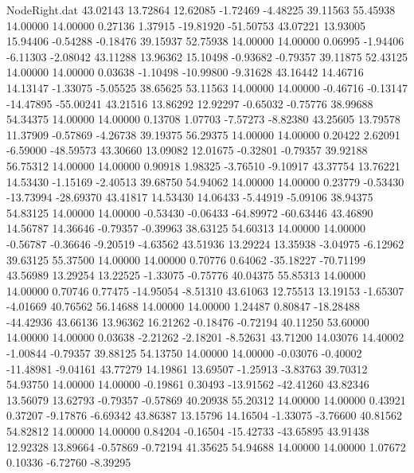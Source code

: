 \begin{filecontents}{NodeRight.dat}
  43.02143   13.72864   12.62085    -1.72469   -4.48225   39.11563   55.45938   14.00000   14.00000    0.27136    1.37915  -19.81920  -51.50753
  43.07221   13.93005   15.94406    -0.54288   -0.18476   39.15937   52.75938   14.00000   14.00000    0.06995   -1.94406   -6.11303   -2.08042
  43.11288   13.96362   15.10498    -0.93682   -0.79357   39.11875   52.43125   14.00000   14.00000    0.03638   -1.10498  -10.99800   -9.31628
  43.16442   14.46716   14.13147    -1.33075   -5.05525   38.65625   53.11563   14.00000   14.00000   -0.46716   -0.13147  -14.47895  -55.00241
  43.21516   13.86292   12.92297    -0.65032   -0.75776   38.99688   54.34375   14.00000   14.00000    0.13708    1.07703   -7.57273   -8.82380
  43.25605   13.79578   11.37909    -0.57869   -4.26738   39.19375   56.29375   14.00000   14.00000    0.20422    2.62091   -6.59000  -48.59573
  43.30660   13.09082   12.01675    -0.32801   -0.79357   39.92188   56.75312   14.00000   14.00000    0.90918    1.98325   -3.76510   -9.10917
  43.37754   13.76221   14.53430    -1.15169   -2.40513   39.68750   54.94062   14.00000   14.00000    0.23779   -0.53430  -13.73994  -28.69370
  43.41817   14.53430   14.06433    -5.44919   -5.09106   38.94375   54.83125   14.00000   14.00000   -0.53430   -0.06433  -64.89972  -60.63446
  43.46890   14.56787   14.36646    -0.79357   -0.39963   38.63125   54.60313   14.00000   14.00000   -0.56787   -0.36646   -9.20519   -4.63562
  43.51936   13.29224   13.35938    -3.04975   -6.12962   39.63125   55.37500   14.00000   14.00000    0.70776    0.64062  -35.18227  -70.71199
  43.56989   13.29254   13.22525    -1.33075   -0.75776   40.04375   55.85313   14.00000   14.00000    0.70746    0.77475  -14.95054   -8.51310
  43.61063   12.75513   13.19153    -1.65307   -4.01669   40.76562   56.14688   14.00000   14.00000    1.24487    0.80847  -18.28488  -44.42936
  43.66136   13.96362   16.21262    -0.18476   -0.72194   40.11250   53.60000   14.00000   14.00000    0.03638   -2.21262   -2.18201   -8.52631
  43.71200   14.03076   14.40002    -1.00844   -0.79357   39.88125   54.13750   14.00000   14.00000   -0.03076   -0.40002  -11.48981   -9.04161
  43.77279   14.19861   13.69507    -1.25913   -3.83763   39.70312   54.93750   14.00000   14.00000   -0.19861    0.30493  -13.91562  -42.41260
  43.82346   13.56079   13.62793    -0.79357   -0.57869   40.20938   55.20312   14.00000   14.00000    0.43921    0.37207   -9.17876   -6.69342
  43.86387   13.15796   14.16504    -1.33075   -3.76600   40.81562   54.82812   14.00000   14.00000    0.84204   -0.16504  -15.42733  -43.65895
  43.91438   12.92328   13.89664    -0.57869   -0.72194   41.35625   54.94688   14.00000   14.00000    1.07672    0.10336   -6.72760   -8.39295

\end{filecontents}
